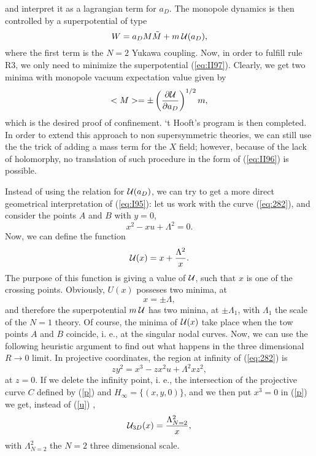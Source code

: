 and interpret it as a lagrangian term for $a_D$. The monopole
dynamics is then controlled by a superpotential of type
\begin{equation}
W=a_DM \tilde{M} + m \: {\cal U}(a_D),
\label{eq:II97}
\end{equation}
where the first term is the $N\!=\!2$ Yukawa coupling. Now, in
order to fulfill rule R3, we only need to minimize the
superpotential (\ref{eq:II97}). Clearly, we get two minima with
monopole vacuum expectation value given by
\begin{equation}
<M> = \pm \left( \frac {\partial {\cal U}}{\partial a_D}
\right)^{1/2} m,
\label{eq:II98}
\end{equation}
which is the desired proof of confinement. `t Hooft's program is
then completed. In order to extend this approach to non
supersymmetric theories, we can still use the the trick of adding
a mass term for the $X$ field; however, because of the lack of
holomorphy, no translation of such procedure in the form of
(\ref{eq:II96}) is possible.
  
Instead of using the relation for ${\cal U}(a_D)$, we can try to
get a more direct geometrical interpretation of (\ref{eq:I95}):
let us work with the curve (\ref{eq:282}), and consider the
points $A$ and $B$ with $y=0$,
\begin{equation}
x^2-xu+\Lambda^2=0.
\label{y=0}
\end{equation}
Now, we can define the function
\begin{equation}
{\cal U}(x) = x + \frac {\Lambda^2}{x}.
\label{u}
\end{equation}
The purpose of this function is giving a value of ${\cal U}$, such that
$x$ is one of the crossing points. Obviously, $U(x)$ posseses two
minima, at
\begin{equation}
x= \pm \Lambda,
\end{equation}
and therefore the superpotential $m \: {\cal U}$ has two minina,
at $\pm \Lambda_1$, with $\Lambda_1$ the scale of the $N=1$
theory. Of course, the minima of ${\cal U}(x)$ take place when
the tow points $A$ and $B$ coincide, i. e., at the singular nodal
curves. Now, we can use the following heuristic argument to find
out what happens in the three dimensional $R \rightarrow 0$
limit. In projective coordinates, the region at infinity of
(\ref{eq:282}) is 
\begin{equation}
zy^2 = x^3 - zx^2 u + \Lambda^2 x z^2,
\label{p}
\end{equation}
at $z=0$. If we delete the infinity point, i. e., the
intersection of the projective curve $C$ defined by (\ref{p}) and
$H_{\infty}=\{(x,y,0)\}$, and we then put $x^3=0$ in (\ref{p}) we
get, instead of (\ref{u}) \cite{SW3d},
\begin{equation}
{\cal U}_{3D}(x) = \frac {\Lambda_{N=2}^2}{x},
\end{equation}
with $\Lambda_{N=2}^2$ the $N=2$ three dimensional scale.



